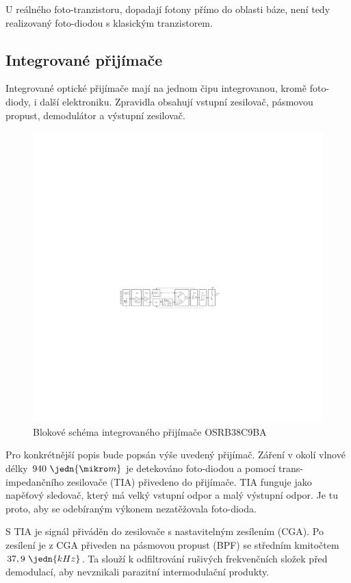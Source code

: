 U reálného foto-tranzistoru, dopadají fotony přímo do oblasti báze, není tedy realizovaný foto-diodou s klasickým tranzistorem.

\subsection{Integrované přijímače}
Integrované optické přijímače mají na jednom čipu integrovanou, kromě foto-diody, i další elektroniku. Zpravidla obsahují vstupní zesilovač, pásmovou propust, demodulátor a výstupní zesilovač.

\begin{figure}[H]
    \begin{center}
        \includegraphics[width=\textwidth]{img/ir-rx}
    \end{center}
    \caption{Blokové schéma integrovaného přijímače OSRB38C9BA}
\end{figure}

Pro konkrétnější popis bude popsán výše uvedený přijímač. Záření v okolí vlnové délky $940~\jedn{\mikro m}$ je detekováno foto-diodou a pomocí trans-impedančního zesilovače (TIA) přivedeno do přijímače. TIA funguje jako napěťový sledovač, který má velký vstupní odpor a malý výstupní odpor. Je tu proto, aby se odebíraným výkonem nezatěžovala foto-dioda.

S TIA je signál přiváděn do zesilovače s nastavitelným zesílením (CGA). Po zesílení je z CGA přiveden na pásmovou propust (BPF) se středním kmitočtem $37,9~\jedn{kHz}$. Ta slouží k odfiltrování rušivých frekvenčních složek před demodulací, aby nevznikali parazitní intermodulační produkty.

